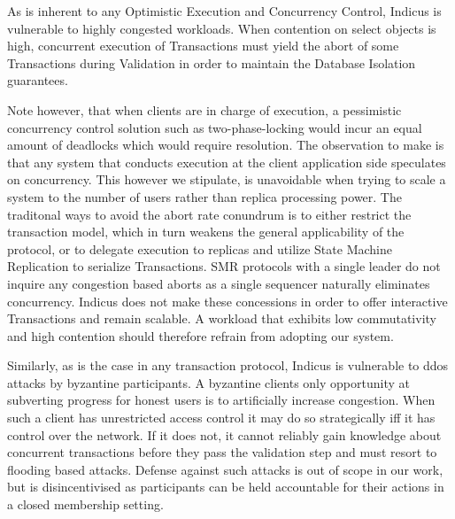 As is inherent to any Optimistic Execution and Concurrency Control, Indicus is vulnerable to highly congested workloads. When contention on select objects is high, concurrent execution of Transactions must yield the abort of some Transactions during Validation in order to maintain the Database Isolation guarantees. 

Note however, that when clients are in charge of execution, a pessimistic concurrency control solution such as two-phase-locking would incur an equal amount of deadlocks which would require resolution. The observation to make is that any system that conducts execution at the client application side speculates on concurrency. This however we stipulate, is unavoidable when trying to scale a system to the number of users rather than replica processing power. The traditonal ways to avoid the abort rate conundrum is to either restrict the transaction model, which in turn weakens the general applicability of the protocol, or to delegate execution to replicas and utilize State Machine Replication to serialize Transactions. SMR protocols with a single leader do not inquire any congestion based aborts as a single sequencer naturally eliminates concurrency.
Indicus does not make these concessions in order to offer interactive Transactions and remain scalable. A workload that exhibits low commutativity and high contention should therefore refrain from adopting our system.

Similarly, as is the case in any transaction protocol, Indicus is vulnerable to ddos attacks by byzantine participants. A byzantine clients only opportunity at subverting progress for honest users is to artificially increase congestion. When such a client has unrestricted access control it may do so strategically iff it has control over the network. If it does not, it cannot reliably gain knowledge about concurrent transactions before they pass the validation step and must resort to flooding based attacks. Defense against such attacks is out of scope in our work, but is disincentivised as participants can be held accountable for their actions in a closed membership setting.



\fi